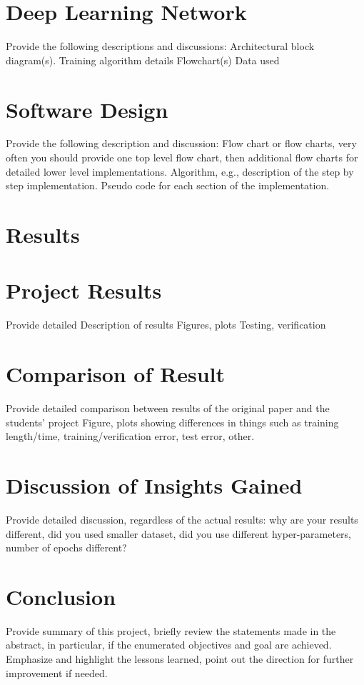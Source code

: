 \documentclass{article}
\begin{document}
\begin{multicols}{2}
\section{Deep Learning Network}
 Provide the following descriptions and discussions: 
Architectural block diagram(s).  
Training algorithm details
Flowchart(s)
Data used


\section{Software Design}
 Provide the following description and discussion: 
Flow chart or flow charts, very often you should provide one top level flow chart, then additional flow charts for detailed lower level implementations.  
Algorithm, e.g., description of the step by step implementation.  
Pseudo code for each section of the implementation. 


\section{Results}

\section{Project Results}
Provide detailed 
Description of results
Figures, plots
Testing, verification


\section{Comparison of Result}
 Provide detailed comparison between results of the original paper and the students’ project
Figure, plots  showing differences in things such as training length/time, training/verification error, test error, other.


\section{Discussion of Insights Gained}
Provide detailed discussion, regardless of the actual results: why are your results different, did you used smaller dataset, did you use different hyper-parameters, number of epochs different?


\section{Conclusion}
Provide summary of this project, briefly review the statements made in the abstract, in particular, if the enumerated objectives and goal are achieved. Emphasize and highlight the lessons learned, point out the direction for further improvement if needed. 


\end{multicols}
\end{document}
